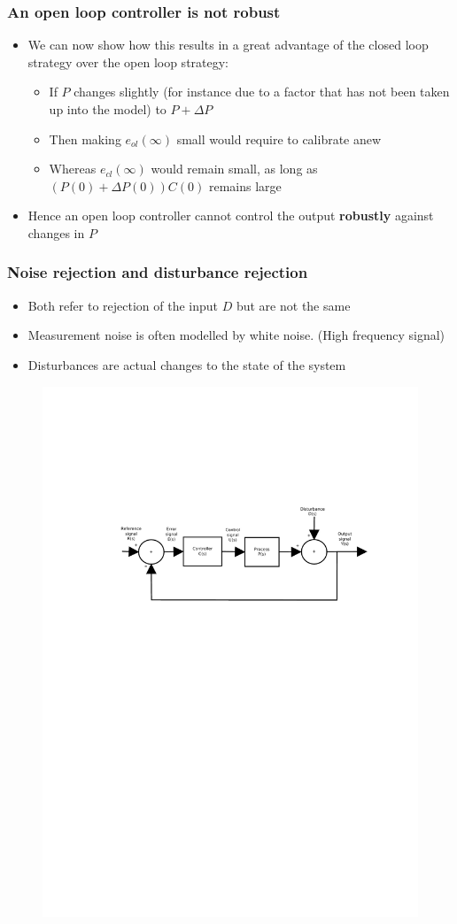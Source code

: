 \begin{frame}
	\frametitle{An open loop controller is not robust}
	\begin{itemize}
		\item We can now show how this results in a great advantage of the closed loop strategy over the open loop strategy:
		\begin{itemize}
			\item If $P$ changes slightly (for instance due to a factor that has not been taken up into the model) to $P+\Delta P$
			\item Then making $e_{ol}(\infty)$ small would require to calibrate anew
			\item Whereas $e_{cl} (\infty)$ would remain small, as long as $(P(0)+\Delta P(0))C(0)$ remains large
			
		\end{itemize}
		\item Hence an open loop controller cannot control the output \textbf{robustly} against changes in $P$
	\end{itemize}
\end{frame}


\begin{frame}
	\frametitle{Noise rejection and disturbance rejection}
	\begin{itemize}
		\item Both refer to rejection of the input $D$ but are not the same
		\item Measurement noise is often modelled by white noise. (High frequency signal)
		\item Disturbances are actual changes to the state of the system
	\end{itemize}
\begin{figure}
\centering
\includegraphics[width=0.7\linewidth]{Closed-Loop}
\caption{}
\label{fig:Closed-Loop3}
\end{figure}

\end{frame}


